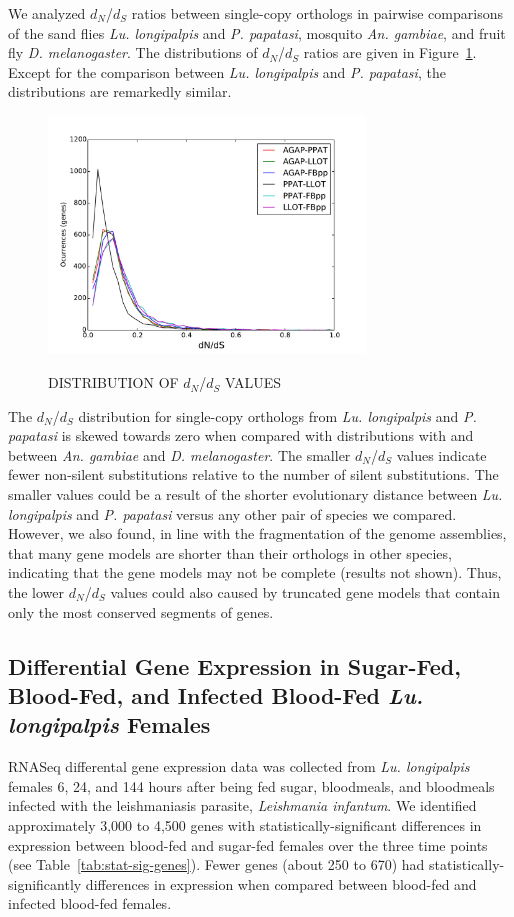 We analyzed $d_N$/$d_S$ ratios between single-copy orthologs in pairwise comparisons of the sand flies \emph{Lu. longipalpis} and \emph{P. papatasi}, mosquito \emph{An. gambiae}, and fruit fly \emph{D. melanogaster}.  The distributions of $d_N$/$d_S$ ratios are given in Figure~\ref{fig:dnds-distr}.  Except for the comparison between \emph{Lu. longipalpis} and \emph{P. papatasi}, the distributions are remarkedly similar.

\begin{figure}[H]
  \centering
  \caption{DISTRIBUTION OF $d_N$/$d_S$ VALUES}
  \includegraphics[width=0.75\textwidth]{figures/ka_ks/dN_dS}
  \label{fig:dnds-distr}
\end{figure}


The $d_N$/$d_S$ distribution for single-copy orthologs from \emph{Lu. longipalpis} and \emph{P. papatasi} is skewed towards zero when compared with distributions with and between \emph{An. gambiae} and \emph{D. melanogaster}.  The smaller $d_N$/$d_S$ values indicate fewer non-silent substitutions relative to the number of silent substitutions.  The smaller values could be a result of the shorter evolutionary distance between \emph{Lu. longipalpis} and \emph{P. papatasi} versus any other pair of species we compared.  However, we also found, in line with the fragmentation of the genome assemblies, that many gene models are shorter than their orthologs in other species, indicating that the gene models may not be complete (results not shown).  Thus, the lower $d_N$/$d_S$ values could also caused by truncated gene models that contain only the most conserved segments of genes.

\subsection{Differential Gene Expression in Sugar-Fed, Blood-Fed, and Infected Blood-Fed \emph{Lu. longipalpis} Females}
RNASeq differental gene expression data was collected from \emph{Lu. longipalpis} females 6, 24, and 144 hours after being fed sugar, bloodmeals, and bloodmeals infected with the leishmaniasis parasite, \emph{Leishmania infantum}.  We identified approximately 3,000 to 4,500 genes with statistically-significant differences in expression between blood-fed and sugar-fed females over the three time points (see Table~\ref{tab:stat-sig-genes}).  Fewer genes (about 250 to 670) had statistically-significantly differences in expression when compared between blood-fed and infected blood-fed females.

